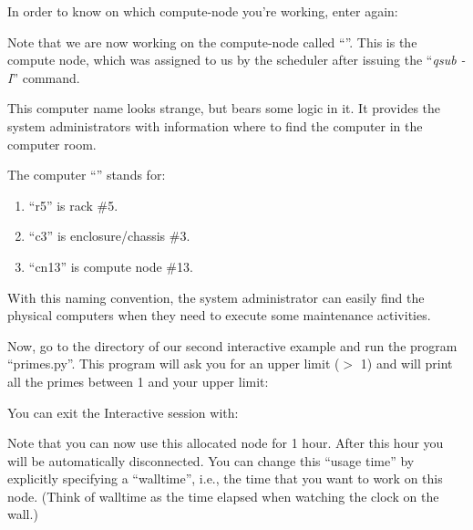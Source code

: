 In order to know on which compute-node you're working, enter again:
\begin{prompt}
\end{prompt}

Note that we are now working on the compute-node called ``\emph{\computenode}''.
This is the compute node, which was assigned to us by the scheduler after
issuing the ``\emph{qsub -I}'' command.

\ifantwerpen
This computer name looks strange, but bears some logic in it.  It provides the
system administrators with information where to find the computer in the
computer room.

The computer ``\emph{\computenodeshort}'' stands for:

\begin{enumerate}
\item  ``r5'' is rack \#5.
\item  ``c3'' is enclosure/chassis \#3.
\item  ``cn13'' is compute node \#13.
\end{enumerate}

With this naming convention, the system administrator can easily find the
physical computers when they need to execute some maintenance activities.
\fi

Now, go to the directory of our second interactive example and run the program
``primes.py''. This program will ask you for an upper limit ($>$ 1) and will
print all the primes between 1 and your upper limit:


You can exit the Interactive session with:
\begin{prompt}
\end{prompt}

Note that you can now use this allocated node for 1 hour.  After this hour you
will be automatically disconnected. You can change this ``usage time'' by
explicitly specifying a ``walltime'', i.e., the time that you want to work on
this node.  (Think of walltime as the time elapsed when watching the clock on
the wall.)

